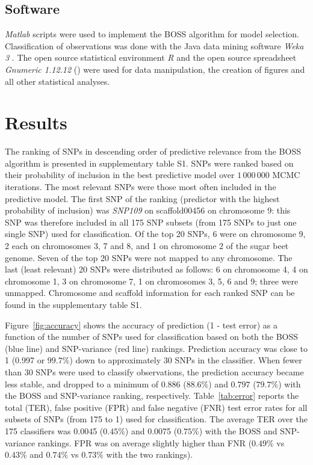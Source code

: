 \subsection{Software}
\label{sec:software}
\emph{Matlab} scripts \cite{MATLAB2010} were used to implement the BOSS
algorithm for model selection. Classification of observations was done
with the Java data mining software \emph{Weka 3} \cite{hall2009weka}.
The open source statistical environment \emph{R} \cite{r2008manual} and
the open source spreadsheet \emph{Gnumeric 1.12.12}
(\cite{gnumeric2014}) were used for data manipulation, the creation of
figures and all other statistical analyses.

\section{Results}
\label{sec:results}
The ranking of SNPs in descending order of predictive relevance from the
BOSS algorithm is presented in supplementary table S1. SNPs were ranked
based on their probability of inclusion in the best predictive model over
$1\,000\,000$ MCMC iterations. The most relevant SNPs were those most often
included in the predictive model. The first SNP of the ranking (predictor with the highest probability of
inclusion) was \emph{SNP109} on scaffold00456 on chromosome 9: this SNP was therefore
included in all 175 SNP subsets (from 175 SNPs to just one single
SNP) used for classification. Of the top 20 SNPs, 6 were on chromosome
9, 2 each on chromosomes 3, 7 and 8, and 1 on chromosome 2 of the sugar
beet genome. Seven of the top 20 SNPs were not mapped to any chromosome. 
The last (least relevant) 20 SNPs were distributed as follows: 6 on chromosome 4, 4 on
chromosome 1, 3 on chromosome 7, 1 on chromosomes 3, 5, 6 and 9; three
were unmapped. Chromosome and scaffold information for each ranked SNP
can be found in the supplementary table S1.
  
Figure~\ref{fig:accuracy} shows the accuracy of prediction (1 - test error) as a function of the number of
SNPs used for classification based on both the BOSS (blue line) and
SNP-variance (red line) rankings. Prediction accuracy was close to 1
(0.997 or $99.7\%$) down to approximately 30 SNPs in the classifier. When fewer than 30 SNPs
were used to classify observations, the prediction accuracy became less
stable, and dropped to a minimum of 0.886 ($88.6\%$) and $0.797$
($79.7\%$) with the BOSS and SNP-variance ranking, respectively.
Table~\ref{tab:error} reports the total (TER), false positive (FPR) and false
negative (FNR) test error rates for all subsets of SNPs (from 175 to 1)
used for classification. 
The average TER over the 175 classifiers was 0.0045 ($0.45\%$) and
0.0075 ($0.75\%$) with the BOSS and SNP-variance rankings. FPR was on average
slightly higher than FNR ($0.49\%$ vs $0.43\%$ and $0.74\%$ vs $0.73\%$
with the two rankings).

